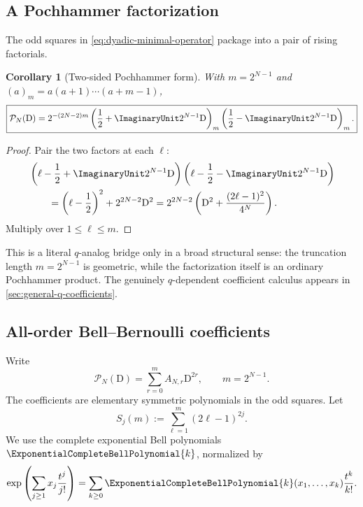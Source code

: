 \documentclass[11pt]{article}
\numberwithin{equation}{section}
\newtheorem{corollary}[theorem]{Corollary}
\theoremstyle{definition}
\theoremstyle{remark}
\newcommand{\D}{\mathrm D}
\begin{document}
\subsection{A Pochhammer factorization}

The odd squares in \eqref{eq:dyadic-minimal-operator} package into a pair of
rising factorials.

\begin{corollary}[Two-sided Pochhammer form]
\label{cor:pochhammer-operator}
With $m=2^{N-1}$ and $(a)_m=a(a+1)\cdots(a+m-1)$,
\begin{equation}
 \boxed{
 \mathcal P_N(\D)=
 2^{-(2N-2)m}
 \left(\frac12+\ImaginaryUnit2^{N-1}\D\right)_m
 \left(\frac12-\ImaginaryUnit2^{N-1}\D\right)_m.}
 \label{eq:pochhammer-operator}
\end{equation}
\end{corollary}
\begin{proof}
Pair the two factors at each $\ell$:
\begin{align*}
 &\left(\ell-\frac12+\ImaginaryUnit2^{N-1}\D\right)
  \left(\ell-\frac12-\ImaginaryUnit2^{N-1}\D\right)\\
 &\qquad=\left(\ell-\frac12\right)^2+2^{2N-2}\D^2
 =2^{2N-2}\left(\D^2+\frac{(2\ell-1)^2}{4^N}\right).
\end{align*}
Multiply over $1\le\ell\le m$.
\end{proof}

This is a literal $q$-analog bridge only in a broad structural sense: the
truncation length $m=2^{N-1}$ is geometric, while the factorization itself is
an ordinary Pochhammer product.  The genuinely $q$-dependent coefficient
calculus appears in \cref{sec:general-q-coefficients}.

\subsection{All-order Bell--Bernoulli coefficients}

Write
\begin{equation}
 \mathcal P_N(\D)=\sum_{r=0}^{m}A_{N,r}\D^{2r},
 \qquad m=2^{N-1}.
 \label{eq:operator-coeff-expansion}
\end{equation}
The coefficients are elementary symmetric polynomials in the odd squares.
Let
\begin{equation}
 S_j(m):=\sum_{\ell=1}^{m}(2\ell-1)^{2j}.
 \label{eq:odd-power-sums}
\end{equation}
We use the complete exponential Bell polynomials $\ExponentialCompleteBellPolynomial{k}$, normalized by
\begin{equation}
 \exp\left(\sum_{j\ge1}x_j\frac{t^j}{j!}\right)
 =\sum_{k\ge0}\ExponentialCompleteBellPolynomial{k}(x_1,\ldots,x_k)\frac{t^k}{k!}.
 \label{eq:Bell-normalization}
\end{equation}
\end{document}
